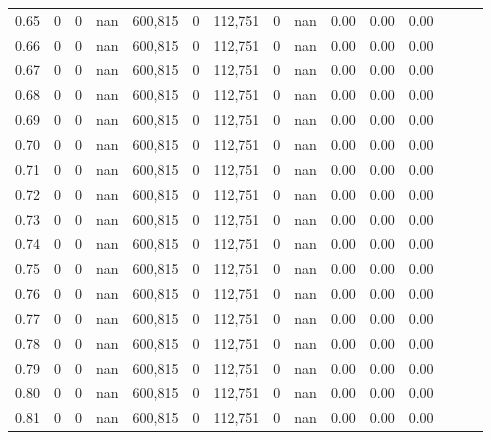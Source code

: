 \begin{tabular}{rrrrrrrrrrrrrrr}
0.65 &        0 &       0 &   nan &  600,815 &        0 &  112,751 &        0 &   nan &  0.00 &  0.00 &      0.00 \\
0.66 &        0 &       0 &   nan &  600,815 &        0 &  112,751 &        0 &   nan &  0.00 &  0.00 &      0.00 \\
0.67 &        0 &       0 &   nan &  600,815 &        0 &  112,751 &        0 &   nan &  0.00 &  0.00 &      0.00 \\
0.68 &        0 &       0 &   nan &  600,815 &        0 &  112,751 &        0 &   nan &  0.00 &  0.00 &      0.00 \\
0.69 &        0 &       0 &   nan &  600,815 &        0 &  112,751 &        0 &   nan &  0.00 &  0.00 &      0.00 \\
0.70 &        0 &       0 &   nan &  600,815 &        0 &  112,751 &        0 &   nan &  0.00 &  0.00 &      0.00 \\
0.71 &        0 &       0 &   nan &  600,815 &        0 &  112,751 &        0 &   nan &  0.00 &  0.00 &      0.00 \\
0.72 &        0 &       0 &   nan &  600,815 &        0 &  112,751 &        0 &   nan &  0.00 &  0.00 &      0.00 \\
0.73 &        0 &       0 &   nan &  600,815 &        0 &  112,751 &        0 &   nan &  0.00 &  0.00 &      0.00 \\
0.74 &        0 &       0 &   nan &  600,815 &        0 &  112,751 &        0 &   nan &  0.00 &  0.00 &      0.00 \\
0.75 &        0 &       0 &   nan &  600,815 &        0 &  112,751 &        0 &   nan &  0.00 &  0.00 &      0.00 \\
0.76 &        0 &       0 &   nan &  600,815 &        0 &  112,751 &        0 &   nan &  0.00 &  0.00 &      0.00 \\
0.77 &        0 &       0 &   nan &  600,815 &        0 &  112,751 &        0 &   nan &  0.00 &  0.00 &      0.00 \\
0.78 &        0 &       0 &   nan &  600,815 &        0 &  112,751 &        0 &   nan &  0.00 &  0.00 &      0.00 \\
0.79 &        0 &       0 &   nan &  600,815 &        0 &  112,751 &        0 &   nan &  0.00 &  0.00 &      0.00 \\
0.80 &        0 &       0 &   nan &  600,815 &        0 &  112,751 &        0 &   nan &  0.00 &  0.00 &      0.00 \\
0.81 &        0 &       0 &   nan &  600,815 &        0 &  112,751 &        0 &   nan &  0.00 &  0.00 &      0.00 \\

\end{tabular}
